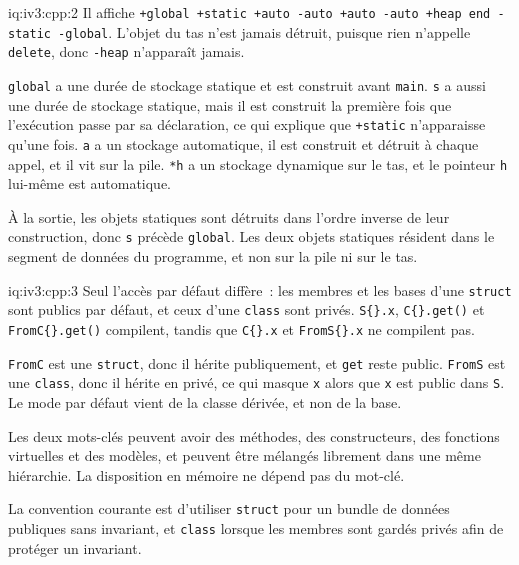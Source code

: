 \begin{solution}{iq:iv3:cpp:2}
Il affiche \texttt{+global +static +auto -auto +auto -auto +heap end -static -global}. L'objet du tas n'est jamais détruit, puisque rien n'appelle \texttt{delete}, donc \texttt{-heap} n'apparaît jamais.

\texttt{global} a une durée de stockage statique et est construit avant \texttt{main}. \texttt{s} a aussi une durée de stockage statique, mais il est construit la première fois que l'exécution passe par sa déclaration, ce qui explique que \texttt{+static} n'apparaisse qu'une fois. \texttt{a} a un stockage automatique, il est construit et détruit à chaque appel, et il vit sur la pile. \texttt{*h} a un stockage dynamique sur le tas, et le pointeur \texttt{h} lui-même est automatique.

À la sortie, les objets statiques sont détruits dans l'ordre inverse de leur construction, donc \texttt{s} précède \texttt{global}. Les deux objets statiques résident dans le segment de données du programme, et non sur la pile ni sur le tas.

\end{solution}

\begin{solution}{iq:iv3:cpp:3}
Seul l'accès par défaut diffère~: les membres et les bases d'une \texttt{struct} sont publics par défaut, et ceux d'une \texttt{class} sont privés. \texttt{S\{\}.x}, \texttt{C\{\}.get()} et \texttt{FromC\{\}.get()} compilent, tandis que \texttt{C\{\}.x} et \texttt{FromS\{\}.x} ne compilent pas.

\texttt{FromC} est une \texttt{struct}, donc il hérite publiquement, et \texttt{get} reste public. \texttt{FromS} est une \texttt{class}, donc il hérite en privé, ce qui masque \texttt{x} alors que \texttt{x} est public dans \texttt{S}. Le mode par défaut vient de la classe dérivée, et non de la base.

Les deux mots-clés peuvent avoir des méthodes, des constructeurs, des fonctions virtuelles et des modèles, et peuvent être mélangés librement dans une même hiérarchie. La disposition en mémoire ne dépend pas du mot-clé.

La convention courante est d'utiliser \texttt{struct} pour un bundle de données publiques sans invariant, et \texttt{class} lorsque les membres sont gardés privés afin de protéger un invariant.

\end{solution}

